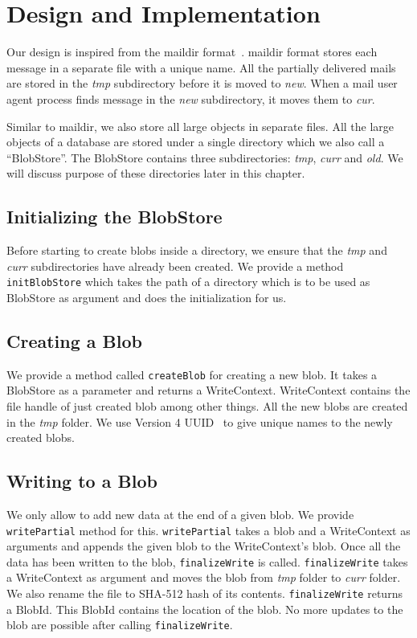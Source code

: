 \chapter{Design and Implementation}
\label{chap:design}

Our design is inspired from the maildir format~\cite{bernstein1995using}. maildir format stores each message in a separate file with a unique name. All the partially delivered mails are stored in the \textit{tmp} subdirectory before it is moved to \textit{new}. When a mail user agent process finds message in the \textit{new} subdirectory, it moves them to \textit{cur}.

Similar to maildir, we also store all large objects in separate files. All the large objects of a database are stored under a single directory which we also call a ``BlobStore''.
The BlobStore contains three subdirectories: \textit{tmp}, \textit{curr} and \textit{old}. We will discuss purpose of these directories later in this chapter.

\section{Initializing the BlobStore}
Before starting to create blobs inside a directory, we ensure that the \textit{tmp} and \textit{curr} subdirectories have already been created. We provide a method \texttt{initBlobStore} which takes the path of a directory which is to be used as BlobStore as argument and does the initialization for us.

\section{Creating a Blob}
We provide a method called \texttt{createBlob} for creating a new blob. It takes a BlobStore as a parameter and returns a WriteContext. WriteContext contains the file handle of just created blob among other things. All the new blobs are created in the \textit{tmp} folder. We use Version 4 UUID~\cite{leach2005universally} to give unique names to the newly created blobs.

\section{Writing to a Blob}
We only allow to add new data at the end of a given blob. We provide \texttt{writePartial} method for this. \texttt{writePartial} takes a blob and a WriteContext as arguments and appends the given blob to the WriteContext's blob.
Once all the data has been written to the blob, \texttt{finalizeWrite} is called. \texttt{finalizeWrite} takes a WriteContext as argument and moves the blob from \textit{tmp} folder to \textit{curr} folder. We also rename the file to SHA-512 hash of its contents.
\texttt{finalizeWrite} returns a BlobId. This BlobId contains the location of the blob. No more updates to the blob are possible after calling \texttt{finalizeWrite}.


